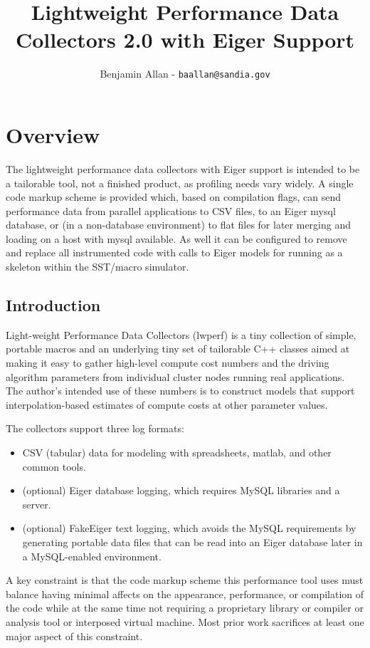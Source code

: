 \documentclass{article}
\title{\textbf{Lightweight Performance Data Collectors 2.0 with Eiger Support}}
\author{Benjamin Allan - \texttt{baallan@sandia.gov}}
\date{}
\begin{document}
\maketitle
\tableofcontents
\clearpage
\section{Overview}
The lightweight performance data collectors with Eiger support is intended to be a tailorable tool, not a finished product, as profiling needs vary widely. A single code markup scheme is provided which, based on compilation flags, can send performance data from parallel applications to CSV files, to an Eiger mysql database, or (in a non-database environment) to flat files for later merging and loading on a host with mysql available. As well it can be configured to remove and replace all instrumented code with calls to Eiger models for running as a skeleton within the SST/macro simulator.

\label{sec:over}
\subsection{Introduction}
Light-weight Performance Data Collectors (lwperf) is a tiny collection of simple, portable macros and an underlying tiny set of tailorable C++ classes aimed at making it easy to gather high-level compute cost numbers and the driving algorithm parameters from individual cluster nodes running real applications. The author's intended use of these numbers is to construct models that support interpolation-based estimates of compute costs at other parameter values. 

The collectors support three log formats: 
\begin{itemize}
\item CSV (tabular) data for modeling with spreadsheets, matlab, and other common tools.
\item (optional) Eiger\cite{eiger} database logging, which requires MySQL libraries and a server.
\item (optional) FakeEiger text logging, which avoids the MySQL requirements by generating portable data files that can be read into an Eiger database later in a MySQL-enabled environment.
\end{itemize}

A key constraint is that the code markup scheme this performance tool uses must balance having minimal affects on the appearance, performance, or compilation of the code while at the same time not requiring a proprietary library or compiler or analysis tool or interposed virtual machine. Most prior work sacrifices at least one major aspect of this constraint.
\end{document}
